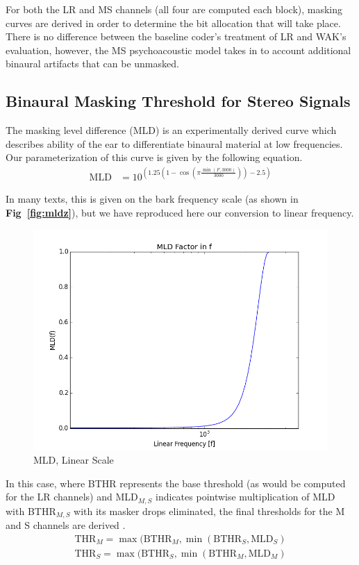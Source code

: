 \documentclass{vldb}
\begin{document}
For both the LR and MS channels (all four are computed each block), masking curves are derived in order to determine the bit allocation that will take place. There is no difference between the baseline coder's treatment of LR and WAK's evaluation, however, the MS psychoacoustic model takes in to account additional binaural artifacts that can be unmasked.

\subsection{Binaural Masking Threshold for Stereo Signals}
The masking level difference (MLD) is an experimentally derived curve which describes ability of the ear to differentiate binaural material at low frequencies. Our parameterization of this curve is given by the following equation.
\begin{align}
\text{MLD} &= 10^{(1.25(1-\cos(\pi \frac{\min(F, 3000)}{3000})) - 2.5)}
\end{align}

In many texts, this is given on the bark frequency scale (as shown in \textbf{Fig~\ref{fig:mldz}}), but we have reproduced here our conversion to linear frequency.

\begin{figure}[ht] 
\centering
\includegraphics[width=3.5 in]{mld_f_2}
\caption{MLD, Linear Scale}
\label{fig:mldf}
\end{figure}

In this case, where BTHR represents the base threshold (as would be computed for the LR channels) and MLD$_{M,S}$ indicates pointwise multiplication of MLD with BTHR$_{M,S}$ with its masker drops eliminated, the final thresholds for the M and S channels are derived \cite{Johnston1992}.
\begin{align}
\text{THR}_M = \max(\text{BTHR}_M, \min( \text{BTHR}_S, \text{MLD}_S )
\end{align}
\begin{align}
\text{THR}_S = \max(\text{BTHR}_S, \min( \text{BTHR}_M, \text{MLD}_M )
\end{align}
\end{document}
